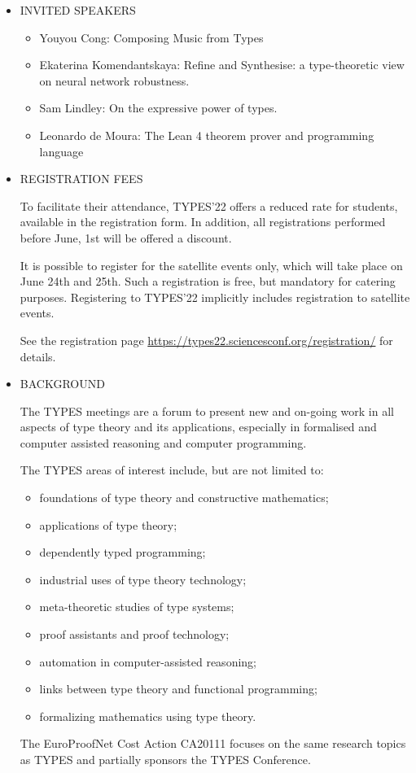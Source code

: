 \documentclass[prodmode,acmtecs]{acmsmall} %
\begin{document}
\begin{itemize}\item  INVITED SPEAKERS 
 
\begin{itemize}\item  Youyou Cong: Composing Music from Types
\item  Ekaterina Komendantskaya: Refine and Synthesise: a type-theoretic view on neural network robustness.
\item  Sam Lindley: On the expressive power of types.
\item  Leonardo de Moura: The Lean 4 theorem prover and programming language
\end{itemize} 
\item  REGISTRATION FEES 
 
  To facilitate their attendance, TYPES'22 offers a reduced rate for students, available in the registration form. In addition, all registrations performed before June, 1st will be offered a discount. 
 
  It is possible to register for the satellite events only, which will take place on June 24th and 25th. Such a registration is free, but mandatory for catering purposes. Registering to TYPES'22 implicitly includes registration to satellite events. 
 
  See the registration page \href{https://types22.sciencesconf.org/registration/}{https://types22.sciencesconf.org/registration/} for details. 
 
\item  BACKGROUND 
 
  The TYPES meetings are a forum to present new and on-going work in all aspects of type theory and its applications, especially in formalised and computer assisted reasoning and computer programming. 
 
  The TYPES areas of interest include, but are not limited to: 
 
\begin{itemize}\item  foundations of type theory and constructive mathematics; 
\item  applications of type theory; 
\item  dependently typed programming; 
\item  industrial uses of type theory technology; 
\item  meta-theoretic studies of type systems; 
\item  proof assistants and proof technology; 
\item  automation in computer-assisted reasoning; 
\item  links between type theory and functional programming; 
\item  formalizing mathematics using type theory.
\end{itemize} 
  The EuroProofNet Cost Action CA20111 focuses on the same research topics as TYPES and partially sponsors the TYPES Conference.  
 

\end{itemize}
\end{document}
